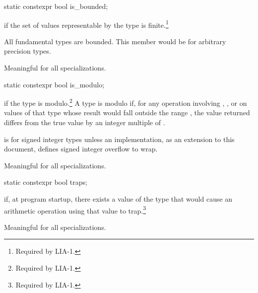 %
\begin{itemdecl}
static constexpr bool is_bounded;
\end{itemdecl}

\begin{itemdescr}
\pnum
{} if the set of values representable by the type is finite.\footnote{Required by LIA-1.}
\begin{note} All fundamental types are bounded. This member would be  for arbitrary
precision types.\end{note}

\pnum
Meaningful for all specializations.
\end{itemdescr}

%
\begin{itemdecl}
static constexpr bool is_modulo;
\end{itemdecl}

\begin{itemdescr}
\pnum
{} if the type is modulo.\footnote{Required by LIA-1.}
A type is modulo if, for any operation involving \tcode{+}, \tcode{-}, or
\tcode{*} on values of that type whose result would fall outside the range
, the value returned differs from the true value by an
integer multiple of .

\pnum
\begin{example}
 is  for signed integer types
unless an implementation, as an extension to this document,
defines signed integer overflow to wrap.
\end{example}

\pnum
Meaningful for all specializations.
\end{itemdescr}

%
\begin{itemdecl}
static constexpr bool traps;
\end{itemdecl}

\begin{itemdescr}
\pnum
{}
if, at program startup, there exists a value of the type that would cause
an arithmetic operation using that value to trap.\footnote{Required by LIA-1.}

\pnum
Meaningful for all specializations.
\end{itemdescr}

